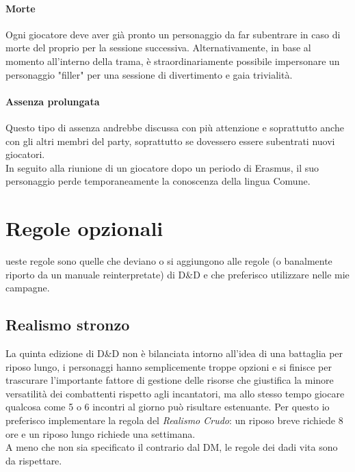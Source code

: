 \paragraph{Morte}

Ogni giocatore deve aver già pronto un personaggio da far subentrare in caso di morte del proprio per la sessione successiva. Alternativamente, in base al momento all'interno della trama, è straordinariamente possibile impersonare un personaggio "filler" per una sessione di divertimento e gaia trivialità.

\paragraph{Assenza prolungata}

Questo tipo di assenza andrebbe discussa con più attenzione e soprattutto anche con gli altri membri del party, soprattutto se dovessero essere subentrati nuovi giocatori. \\ In seguito alla riunione di un giocatore dopo un periodo di Erasmus, il suo personaggio perde temporaneamente la conoscenza della lingua Comune.

\section{Regole opzionali}

ueste regole sono quelle che deviano o si aggiungono alle regole (o banalmente riporto da un manuale reinterpretate) di D\&D e che preferisco utilizzare nelle mie campagne.

\subsection{Realismo stronzo}

La quinta edizione di D\&D non è bilanciata intorno all'idea di una battaglia per riposo lungo, i personaggi hanno semplicemente troppe opzioni e si finisce per trascurare l'importante fattore di gestione delle risorse che giustifica la minore versatilità dei combattenti rispetto agli incantatori, ma allo stesso tempo giocare qualcosa come 5 o 6 incontri al giorno può risultare estenuante. Per questo io preferisco implementare la regola del \textit{Realismo Crudo}: un riposo breve richiede 8 ore e un riposo lungo richiede una settimana. \\ A meno che non sia specificato il contrario dal DM, le regole dei dadi vita sono da rispettare.

